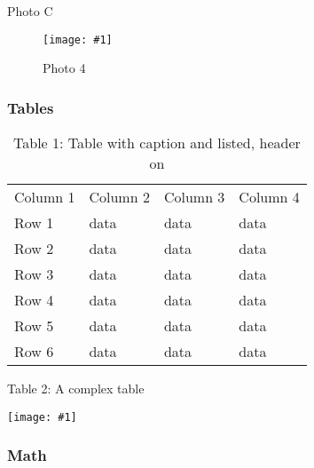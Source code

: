 \documentclass{article}
\newlength{\imgwidth}
\newcommand\scaledgraphics[2]{%
                
\settowidth{\imgwidth}{\texttt{[image: \#1]}}%
                
\setlength{\imgwidth}{\minof{\imgwidth}{#2\textwidth}}%
                
\texttt{[image: \#1]}%
                
}
\begin{document}
Photo C

\begin{figure}
\scaledgraphics{36448392-2aec-4123-9310-a7e9d375d438.jpg}{0.5}
\caption*{Photo 4}\label{F91410751}
\end{figure}





\subsubsection{Tables}\label{H8876846}


\begin{table}
\caption*{Table 1: Table with caption and listed, header on}\label{T66652301}

\begin{tabu} to \textwidth { |X|X|X|X| }
\hline



Column 1 & Column 2 & Column 3 & Column 4
 \\


Row 1 & data & data & data
 \\


Row 2 & data & data & data
 \\


Row 3 & data & data & data
 \\


Row 4 & data & data & data
 \\


Row 5 & data & data & data
 \\


Row 6 & data & data & data
 \\
\hline

\end{tabu}\end{table}


\begin{center}
\begin{table}
\caption*{Table 2: A complex table}\label{F8966261}
\scaledgraphics{9e9b653f-c96b-4f61-94e3-84c0be199871.jpg}{0.5}
\end{table}


\end{center}


\subsubsection{Math}\label{H225619}
\end{document}
